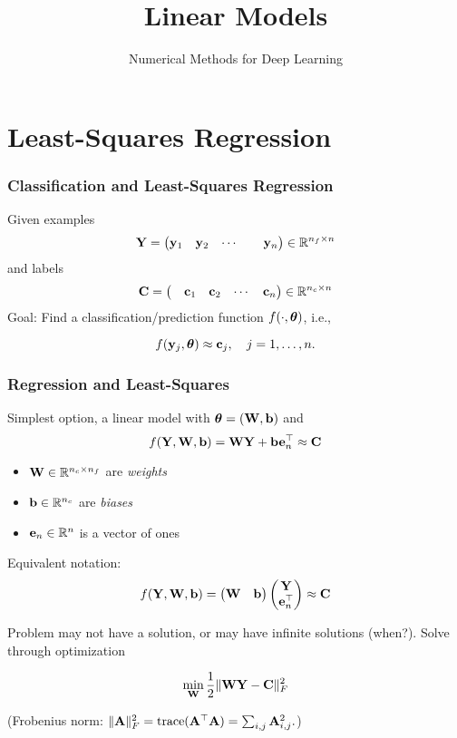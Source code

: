 \documentclass[12pt,fleqn,beamer]{beamer}
\title{Linear Models}
\subtitle{Numerical Methods for Deep Learning}
\date{}
\begin{document}
\makebeamertitle


\section{Least-Squares Regression} %
\label{sec:least_squares_regression}
\begin{frame}\frametitle{Classification and Least-Squares Regression}

Given examples
$$ {\bf Y} = \begin{pmatrix}  {\bf y}_1 &  {\bf y}_2   & \cdots & & {\bf y}_n \end{pmatrix} \in\mathbb{R}^{n_f\times n}$$
and labels
$$ {\bf C} = \begin{pmatrix} & {\bf c}_1  &  {\bf c}_2  & \cdots &  {\bf c}_n \end{pmatrix} \in\mathbb{R}^{n_c\times n}$$
Goal: Find a classification/prediction function $f(\cdot,{\boldsymbol \theta})$, i.e., 

$$
f({\bf y}_j,{\boldsymbol \theta}) \approx {\bf c}_j, \quad j=1,\ldots,n.
$$

\end{frame}

\begin{frame}\frametitle{Regression and Least-Squares}

Simplest option, a linear model with ${\boldsymbol \theta} = ({\bf W},{\bf b})$ and
$$ f({\bf Y},{\bf W},{\bf b}) =  {\bf W} {\bf Y} + {\bf b} {\bf e}_n^\top \approx {\bf C} $$
\begin{itemize}
	\item ${\bf W} \in \mathbb{R}^{n_c \times n_f}$ are \emph{weights}
	\item ${\bf b} \in \mathbb{R}^{n_c}$ are \emph{biases}
	\item ${\bf e}_n \in \mathbb{R}{^n}$ is a vector of ones
\end{itemize} 
Equivalent notation:
$$f({\bf Y},{\bf W},{\bf b}) = \begin{pmatrix} {\bf W} & {\bf b} \end{pmatrix} \begin{pmatrix} {\bf Y} \\ {\bf e}_n^\top \end{pmatrix} \approx {\bf C}$$

Problem may not have a solution, or may have infinite solutions (when?).
Solve through optimization
 
$$ \min_{{\bf W}} {\frac 12} \|{\bf W} {\bf Y} - {\bf C}\|^2_F $$

(Frobenius norm: $\|{\bf A}\|_F^2 = {\rm trace}({\bf A}^{\top} {\bf A}) = \sum_{i,j} {\bf A}_{i,j}^2. $)

\end{frame}
\end{document}
